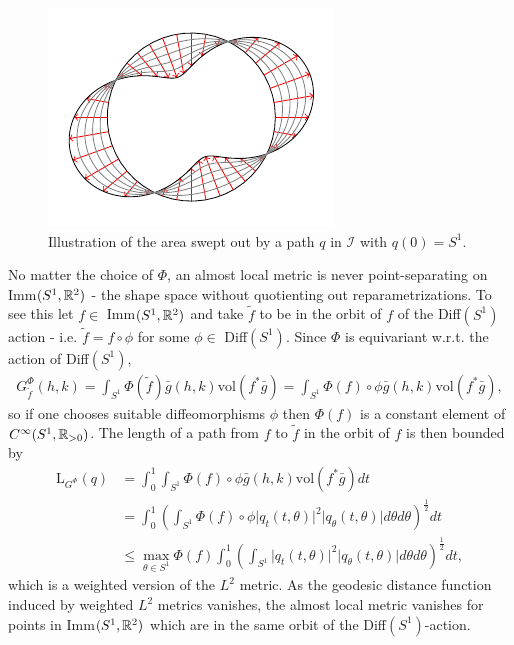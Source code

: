 \begin{figure}[h!]
  \centering
    \includegraphics[scale = 1]{deform_circle.pdf}
  \caption{Illustration of the area swept out by a path $q$ in $\mathcal{I}$ with $q(0) = S^1$.}
  \label{fig:area-swep}
\end{figure}

No matter the choice of $\Phi$, an almost local metric is never point-separating on Imm$(S^1, \mathbb{R}^2)$ - the shape space without quotienting out reparametrizations. To see this let $f \in$ Imm$(S^1, \mathbb{R}^2)$ and take $\tilde{f}$ to be in the orbit of $f$ of the Diff$(S^1)$ action - i.e. $\tilde{f} = f \circ \phi$ for some $\phi \in$ Diff$(S^1)$. Since $\Phi$ is equivariant w.r.t. the action of Diff$(S^1)$,
\begin{align*}
G_{\tilde{f}}^\Phi (h,k) = \int_{S^1} \Phi(\tilde{f}) \bar{g}(h,k) \text{vol}(f^* \bar{g}) = \int_{S^1} \Phi(f) \circ \phi \bar{g}(h,k) \text{vol}(f^* \bar{g}),
\end{align*}
so if one chooses suitable diffeomorphisms $\phi$ then $\Phi(f)$ is a constant element of $C^\infty(S^1, \mathbb{R}_{> 0})$. The length of a path from $f$ to $\tilde{f}$ in the orbit of $f$ is then bounded by
\begin{align*}
\mathrm{L}_{G^\Phi}(q) & = \int_0^1 \int_{S^1} \Phi(f) \circ \phi \bar{g}(h,k) \text{vol}(f^* \bar{g}) dt \\ 
& = \int_0^1 \left( \int_{S^1} \Phi(f) \circ \phi \vert q_t(t, \theta) \vert ^2 \vert q_\theta(t, \theta) \vert d \theta d \theta \right) ^{\frac{1}{2}} dt \\
& \leq \max_{\theta \in S^1} \Phi(f) \int_0^1 \left( \int_{S^1} \vert q_t(t, \theta) \vert ^2 \vert q_\theta(t, \theta) \vert d \theta d \theta \right) ^{\frac{1}{2}} dt, 
\end{align*}
which is a weighted version of the $L^2$ metric. As the geodesic distance function induced by weighted $L^2$ metrics vanishes, the almost local metric vanishes for points in Imm$(S^1, \mathbb{R}^2)$ which are in the same orbit of the Diff$(S^1)$-action.

